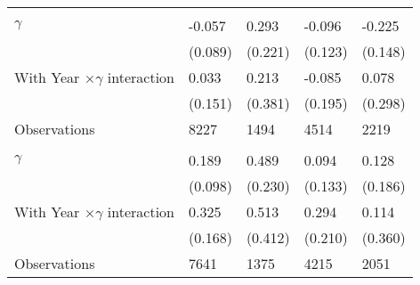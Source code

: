 {\begin{tabularx}{0.85\linewidth}{l *{4}{Y}}
\midrule
\addlinespace
{} \\
\addlinespace
$\gamma$        &   -0.057 &    0.293   &   -0.096     &   -0.225       \\
                &  (0.089)    &  (0.221)      &  (0.123)     &  (0.148)  \\
\addlinespace
  With Year $\times\gamma$ interaction   &    0.033    &   0.213    &  -0.085    &   0.078   \\
       &  (0.151)     &  (0.381)     &  (0.195)    &  (0.298)      \\
\midrule
Observations   &     8227  &     1494 &     4514  &     2219         \\

\midrule
\addlinespace
{} \\
\addlinespace
$\gamma$        &    0.189\sym{*}  &    0.489\sym{**} &    0.094    &  0.128  \\
                &  (0.098)  &  (0.230)   &  (0.133)     &  (0.186)        \\
\addlinespace
 With Year $\times\gamma$ interaction  &  0.325\sym{*} &  0.513 &  0.294  &  0.114         \\
        &  (0.168)      &  (0.412)    &  (0.210)      &  (0.360)   \\
\midrule
Observations   &     7641  &     1375 &     4215 &     2051         \\
\bottomrule

\end{tabularx}
}

